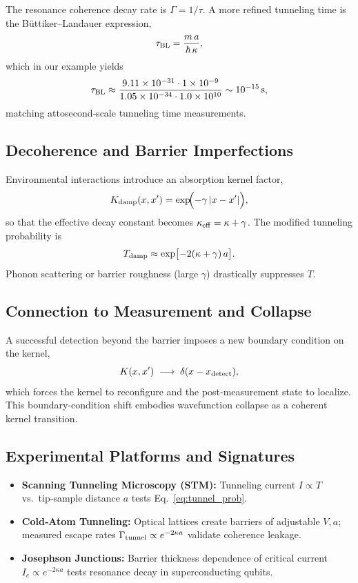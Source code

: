 The resonance coherence decay rate is $\Gamma = 1/\tau$.  A more refined tunneling time is the Büttiker–Landauer expression,
\begin{equation}\label{eq:BL_time}
\tau_{\rm BL}
= \frac{m\,a}{\hbar\,\kappa},
\end{equation}
which in our example yields
\[
\tau_{\rm BL}
\approx \frac{9.11\times10^{-31}\cdot1\times10^{-9}}{1.05\times10^{-34}\cdot1.0\times10^{10}}
\sim 10^{-15}\,\mathrm{s},
\]
matching attosecond‐scale tunneling time measurements.

\subsection{Decoherence and Barrier Imperfections}

Environmental interactions introduce an absorption kernel factor,
\begin{equation}\label{eq:absorption_kernel}
K_{\rm damp}(x,x') = \exp\!\Bigl(-\gamma\,|x - x'|\Bigr),
\end{equation}
so that the effective decay constant becomes $\kappa_{\rm eff}=\kappa+\gamma$.  The modified tunneling probability is
\begin{equation}\label{eq:tunnel_damped}
T_{\rm damp}
\approx \exp\bigl[-2(\kappa+\gamma)\,a\bigr].
\end{equation}
Phonon scattering or barrier roughness (large $\gamma$) drastically suppresses $T$.

\subsection{Connection to Measurement and Collapse}

A successful detection beyond the barrier imposes a new boundary condition on the kernel,
\[
K(x,x') \;\longrightarrow\; \delta(x - x_{\rm detect}),
\]
which forces the kernel to reconfigure and the post‐measurement state to localize.  This boundary‐condition shift embodies wavefunction collapse as a coherent kernel transition.

\subsection{Experimental Platforms and Signatures}

\begin{itemize}
  \item \textbf{Scanning Tunneling Microscopy (STM):} Tunneling current $I\propto T$ vs.\ tip‐sample distance $a$ tests Eq.~\eqref{eq:tunnel_prob}.  
  \item \textbf{Cold‐Atom Tunneling:} Optical lattices create barriers of adjustable $V,a$; measured escape rates $\Gamma_{\rm tunnel}\propto e^{-2\kappa a}$ validate coherence leakage.  
  \item \textbf{Josephson Junctions:} Barrier thickness dependence of critical current $I_c\propto e^{-2\kappa a}$ tests resonance decay in superconducting qubits.
\end{itemize}

